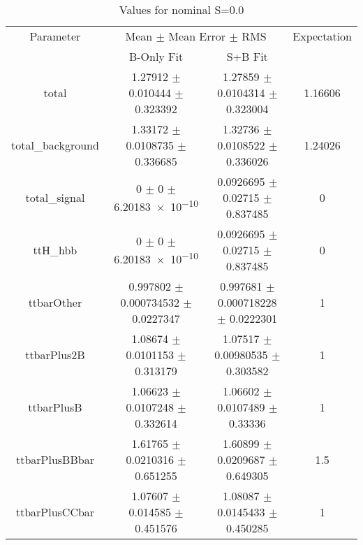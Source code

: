 \begin{table}
\centering
\caption{Values for nominal S=0.0}
\begin{tabular}{cccc}
\toprule
Parameter & \multicolumn{2}{c}{Mean $\pm$ Mean Error $\pm$ RMS} & Expectation\\
 & B-Only Fit & S+B Fit & \\
\midrule
total & \num{1.27912} $\pm$ \num{0.010444} $\pm$ \num{0.323392} & \num{1.27859} $\pm$ \num{0.0104314} $\pm$ \num{0.323004} & \num{1.16606}\\
total\_background & \num{1.33172} $\pm$ \num{0.0108735} $\pm$ \num{0.336685} & \num{1.32736} $\pm$ \num{0.0108522} $\pm$ \num{0.336026} & \num{1.24026}\\
total\_signal & \num{0} $\pm$ \num{0} $\pm$ \num{6.20183e-10} & \num{0.0926695} $\pm$ \num{0.02715} $\pm$ \num{0.837485} & \num{0}\\
ttH\_hbb & \num{0} $\pm$ \num{0} $\pm$ \num{6.20183e-10} & \num{0.0926695} $\pm$ \num{0.02715} $\pm$ \num{0.837485} & \num{0}\\
ttbarOther & \num{0.997802} $\pm$ \num{0.000734532} $\pm$ \num{0.0227347} & \num{0.997681} $\pm$ \num{0.000718228} $\pm$ \num{0.0222301} & \num{1}\\
ttbarPlus2B & \num{1.08674} $\pm$ \num{0.0101153} $\pm$ \num{0.313179} & \num{1.07517} $\pm$ \num{0.00980535} $\pm$ \num{0.303582} & \num{1}\\
ttbarPlusB & \num{1.06623} $\pm$ \num{0.0107248} $\pm$ \num{0.332614} & \num{1.06602} $\pm$ \num{0.0107489} $\pm$ \num{0.33336} & \num{1}\\
ttbarPlusBBbar & \num{1.61765} $\pm$ \num{0.0210316} $\pm$ \num{0.651255} & \num{1.60899} $\pm$ \num{0.0209687} $\pm$ \num{0.649305} & \num{1.5}\\
ttbarPlusCCbar & \num{1.07607} $\pm$ \num{0.014585} $\pm$ \num{0.451576} & \num{1.08087} $\pm$ \num{0.0145433} $\pm$ \num{0.450285} & \num{1}\\
\bottomrule
\end{tabular}
\end{table}